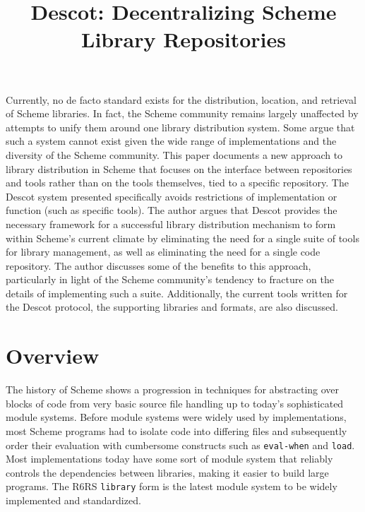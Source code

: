  



\title{Descot: Decentralizing Scheme Library Repositories}

\maketitle

\beginabstract

Currently, no de facto standard exists for the distribution, 
location, and retrieval of Scheme libraries. 
In fact, the Scheme community 
remains largely unaffected by attempts to unify them
around one library distribution system. Some argue that such 
a system cannot exist given the wide range of implementations 
and the diversity of the Scheme community. This paper documents 
a new approach to library distribution in Scheme that focuses 
on the interface between repositories and tools rather than 
on the tools themselves, tied to a specific repository.  The Descot
system presented specifically avoids restrictions
of implementation or function (such as specific tools). The author 
argues that Descot provides the necessary framework for a successful 
library distribution mechanism to form within 
Scheme's current climate by eliminating the need for a single suite of 
tools for library management, as well as eliminating the need for a 
single code repository. The author discusses some of the benefits 
to this approach, particularly in light of the Scheme community's 
tendency to fracture on the details of 
implementing such a suite. 
Additionally, the current tools written 
for the Descot protocol, the supporting libraries and formats, 
are also discussed.

\endabstract

\section{Overview}

The history of Scheme shows a progression in techniques 
for abstracting over blocks of code from very basic source 
file handling up to today's sophisticated module 
systems. Before module systems were widely used by implementations, 
most Scheme programs had to isolate code into differing files 
and subsequently order their evaluation with
cumbersome constructs such as {\tt eval-when} and {\tt load}. 
Most implementations today have some sort of module system 
that reliably controls the dependencies between libraries, 
making it easier to build large programs.
The R6RS {\tt library} form is the latest module system to 
be widely implemented and standardized.\cite{r6rs}

